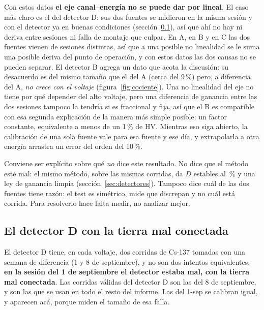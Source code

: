 \documentclass[11pt,a4paper]{article}
\begin{document}
Con estos datos \textbf{el eje canal--energía no se puede dar por lineal}. El
caso más claro es el del detector D: sus dos fuentes se midieron en la misma
sesión y con el detector ya en buenas condiciones (sección~\ref{sec:repro}), así
que ahí no hay ni deriva entre sesiones ni falla de montaje que culpar. En A,
en B y en C las dos fuentes vienen de sesiones distintas, así que a una posible
no linealidad se le suma una posible deriva del punto de operación, y con estos
datos las dos causas no se pueden separar. El detector B agrega un dato que
acota la discusión: su desacuerdo es del mismo tamaño que el del A (cerca del
9\,\%) pero, a diferencia del A, \emph{no crece con el voltaje}
(figura~\ref{fig:cociente}). Una no linealidad del eje no tiene por qué
depender del alto voltaje, pero una diferencia de ganancia entre las dos
sesiones tampoco la tendría si es fraccional y fija, así que el B es
compatible con esa segunda explicación de la manera más simple posible: un
factor constante, equivalente a menos de un 1\,\% de HV. Mientras eso siga abierto, la
calibración de una sola fuente vale para esa fuente y ese día, y extrapolarla
a otra energía arrastra un error del orden del 10\,\%.

\begin{aviso}
Conviene ser explícito sobre qué \emph{no} dice este resultado. No dice que el
método esté mal: el mismo método, sobre las mismas corridas, da $D$ estables
al \ErrRelMediano\,\% y una ley de ganancia limpia (sección~\ref{sec:detectores}).
Tampoco dice cuál de las dos fuentes tiene razón: el test es simétrico, mide
que discrepan y no cuál está corrida. Para resolverlo hace falta medir, no
analizar mejor.
\end{aviso}

\subsection{El detector D con la tierra mal conectada}
\label{sec:repro}

El detector D tiene, en cada voltaje, dos corridas de Cs-137 tomadas con una
semana de diferencia (1 y 8 de septiembre), y no son dos intentos equivalentes:
\textbf{en la sesión del 1 de septiembre el detector estaba mal, con la tierra
mal conectada}. Las corridas válidas del detector D son las del 8 de
septiembre, y son las que se usan en todo el resto del informe. Las del 1-sep
se calibran igual, y aparecen acá, porque miden el tamaño de esa falla.

\begin{table}[htbp]
\centering
\caption{El mismo punto y la misma fuente, con y sin la falla de tierra.}
\label{tab:repro}
{\small}
\end{table}
\end{document}
